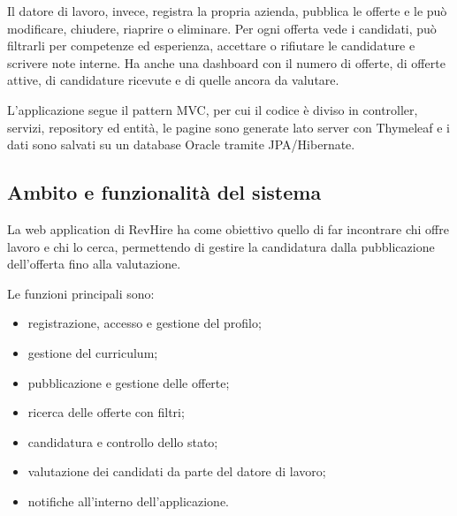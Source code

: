 \documentclass[12pt,a4paper]{article}
\begin{document}
    Il datore di lavoro, invece, registra la propria azienda, pubblica le
    offerte e le può modificare, chiudere, riaprire o eliminare. Per ogni
    offerta vede i candidati, può filtrarli per competenze ed esperienza,
    accettare o rifiutare le candidature e scrivere note interne. Ha anche una
    dashboard con il numero di offerte, di offerte attive, di candidature
    ricevute e di quelle ancora da valutare.

    L'applicazione segue il pattern MVC, per cui il codice è diviso in controller,
    servizi, repository ed entità, le pagine sono generate lato server con
    Thymeleaf e i dati sono salvati su un database Oracle tramite JPA/Hibernate.

    \subsection{Ambito e funzionalità del sistema}
    La web application di RevHire ha come obiettivo quello di far incontrare chi offre lavoro e chi lo cerca, permettendo di
    gestire la candidatura dalla pubblicazione dell'offerta fino alla valutazione.

    Le funzioni principali sono:
    \begin{itemize}
        \item registrazione, accesso e gestione del profilo;
        \item gestione del curriculum;
        \item pubblicazione e gestione delle offerte;
        \item ricerca delle offerte con filtri;
        \item candidatura e controllo dello stato;
        \item valutazione dei candidati da parte del datore di lavoro;
        \item notifiche all'interno dell'applicazione.
    \end{itemize}
\end{document}
